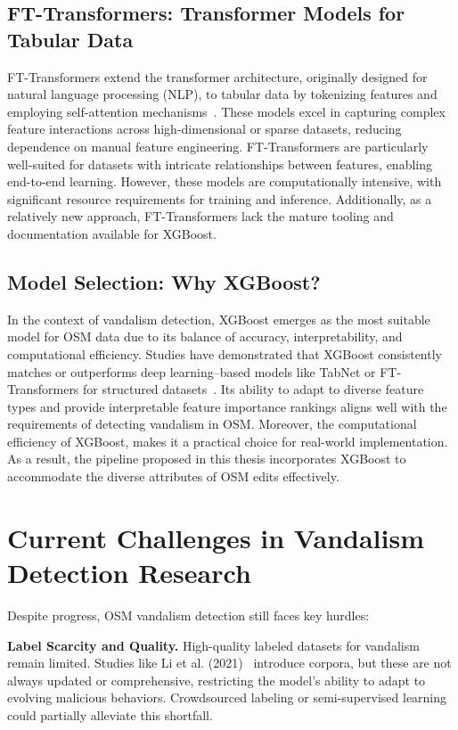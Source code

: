 \documentclass[
    13pt, %
    a4paper, %
    listof=totoc, %
    bibliography=totoc, %
    index=totoc, %
    headsepline
]{scrreprt}
\begin{document}
\subsection{FT-Transformers: Transformer Models for Tabular Data}
FT-Transformers extend the transformer architecture, originally designed for natural language processing (NLP), to tabular data by tokenizing features and employing self-attention mechanisms~\cite{Gorishniy2021}. These models excel in capturing complex feature interactions across high-dimensional or sparse datasets, reducing dependence on manual feature engineering. FT-Transformers are particularly well-suited for datasets with intricate relationships between features, enabling end-to-end learning. However, these models are computationally intensive, with significant resource requirements for training and inference. Additionally, as a relatively new approach, FT-Transformers lack the mature tooling and documentation available for XGBoost. 

\subsection{Model Selection: Why XGBoost?}
In the context of vandalism detection, XGBoost emerges as the most suitable model for OSM data due to its balance of accuracy, interpretability, and computational efficiency. Studies have demonstrated that XGBoost consistently matches or outperforms deep learning–based models like TabNet or FT-Transformers for structured datasets~\cite{chen2016xgboost, Gorishniy2021}. Its ability to adapt to diverse feature types and provide interpretable feature importance rankings aligns well with the requirements of detecting vandalism in OSM. Moreover, the computational efficiency of XGBoost, makes it a practical choice for real-world implementation. As a result, the pipeline proposed in this thesis incorporates XGBoost to accommodate the diverse attributes of OSM edits effectively.


\section{Current Challenges in Vandalism Detection Research}

Despite progress, OSM vandalism detection still faces key hurdles:

\noindent
\textbf{Label Scarcity and Quality.}
High-quality labeled datasets for vandalism remain limited. Studies like Li et al. (2021)~\cite{Li2021} introduce corpora, but these are not always updated or comprehensive, restricting the model’s ability to adapt to evolving malicious behaviors. Crowdsourced labeling or semi-supervised learning could partially alleviate this shortfall.
\end{document}
